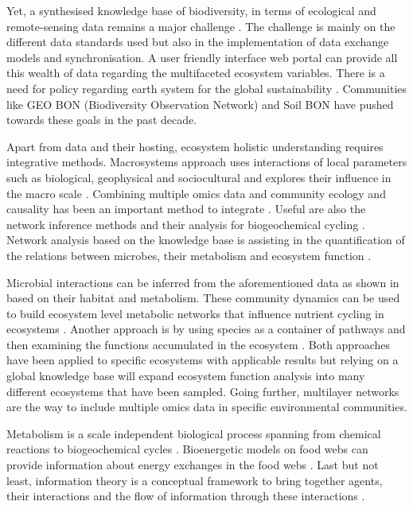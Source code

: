 Yet, a synthesised knowledge base of biodiversity, in terms of ecological and
remote-sensing data remains a major challenge \parencite{feng2022Review}. The challenge
is mainly on the different data standards used but also in the implementation of 
data exchange models and synchronisation.
A user friendly interface web portal can provide all this wealth of data
regarding the multifaceted ecosystem variables. There is a need for policy regarding earth system for the global
sustainability \parencite{reid2010earth}. Communities like GEO BON (Biodiversity Observation Network) and Soil BON
have pushed towards these goals in the past decade.

Apart from data and their hosting, ecosystem holistic understanding requires
integrative methods. Macrosystems approach uses interactions of local parameters
such as biological, geophysical and sociocultural and explores their influence in
the macro scale \parencite{heffernan2014}. Combining multiple omics data and community ecology and causality has
been an important method to integrate \parencite{jurburg2022community}. Useful are also the network inference methods 
and their analysis for biogeochemical cycling \parencite{jameson2023Network}.
Network analysis based on the knowledge base is assisting in the quantification
of the relations between microbes, their metabolism and ecosystem
function \parencite{graham2016Microbes,muller2018Using, perez_garcia2016Metabolic}.

Microbial interactions can be inferred from the aforementioned data as shown
in \textcite{machado2021Polarization} based on their habitat and metabolism.
These community dynamics can be used to build ecosystem level metabolic
networks \parencite{perez_garcia2016Metabolic} that influence nutrient cycling in
ecosystems \parencite{bauer2018Network}. Another approach is by using species as a
container of pathways and then examining the functions accumulated in the
ecosystem \parencite{loucaDecouplingFunctionTaxonomy2016}. Both approaches have
been applied to specific ecosystems with applicable results but relying on a
global knowledge base will expand ecosystem function analysis into many
different ecosystems that have been sampled.
Going further, multilayer networks \parencite{marine-multilayers}
are the way to include multiple omics data in specific environmental communities. 

Metabolism is a scale independent biological process spanning from chemical reactions
to biogeochemical cycles \parencite{hall2018understanding}. Bioenergetic models on food 
webs can provide information about energy exchanges in the food webs \parencite{valdovinos2023bioenergetic}.
Last but not least, information theory is a conceptual framework to bring together agents,
their interactions and the flow of information through these interactions \parencite{oconnor-information-ecology}.

